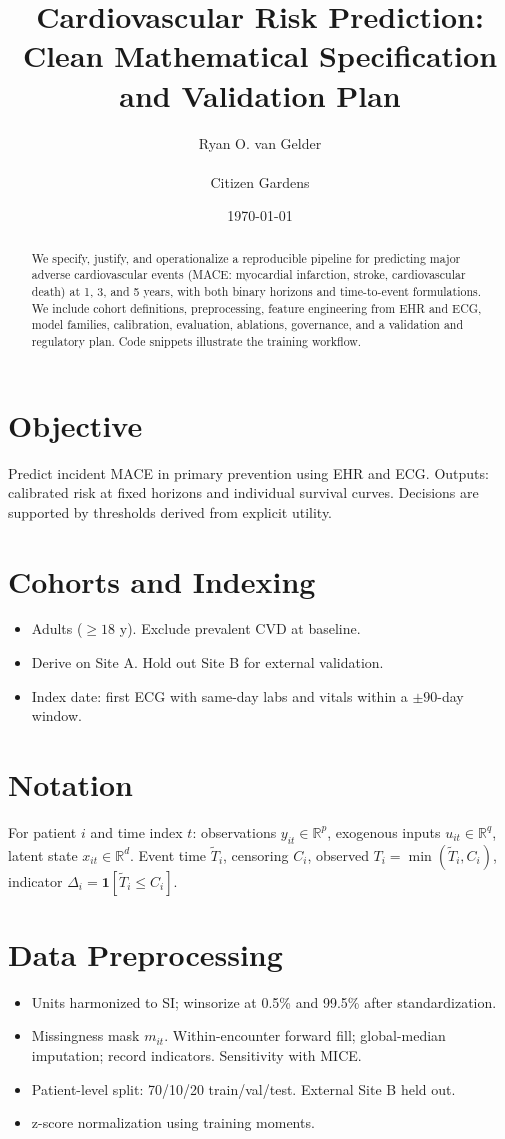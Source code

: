 \documentclass[11pt]{article}
\title{Cardiovascular Risk Prediction: Clean Mathematical Specification and Validation Plan}
\author{Ryan O. van Gelder \\ \\ Citizen Gardens} \\ \\
\date{\today}
\begin{document}
\maketitle
\begin{abstract}
We specify, justify, and operationalize a reproducible pipeline for predicting major adverse cardiovascular events (MACE: myocardial infarction, stroke, cardiovascular death) at 1, 3, and 5 years, with both binary horizons and time-to-event formulations. We include cohort definitions, preprocessing, feature engineering from EHR and ECG, model families, calibration, evaluation, ablations, governance, and a validation and regulatory plan. Code snippets illustrate the training workflow.
\end{abstract}

\section{Objective}
Predict incident MACE in primary prevention using EHR and ECG. Outputs: calibrated risk at fixed horizons and individual survival curves. Decisions are supported by thresholds derived from explicit utility.

\section{Cohorts and Indexing}
\begin{itemize}[noitemsep]
  \item Adults (\(\geq 18\) y). Exclude prevalent CVD at baseline.
  \item Derive on Site A. Hold out Site B for external validation.
  \item Index date: first ECG with same-day labs and vitals within a \(\pm 90\)-day window.
\end{itemize}

\section{Notation}
For patient \(i\) and time index \(t\): observations \(y_{it}\in\mathbb{R}^{p}\), exogenous inputs \(u_{it}\in\mathbb{R}^{q}\), latent state \(x_{it}\in\mathbb{R}^{d}\). Event time \(\tilde T_i\), censoring \(C_i\), observed \(T_i=\min(\tilde T_i,C_i)\), indicator \(\Delta_i=\mathbf 1[\tilde T_i\le C_i]\).

\section{Data Preprocessing}
\begin{itemize}[noitemsep]
  \item Units harmonized to SI; winsorize at 0.5\% and 99.5\% after standardization.
  \item Missingness mask \(m_{it}\). Within-encounter forward fill; global-median imputation; record indicators. Sensitivity with MICE.
  \item Patient-level split: 70/10/20 train/val/test. External Site B held out.
  \item z-score normalization using training moments.
\end{itemize}
\end{document}
